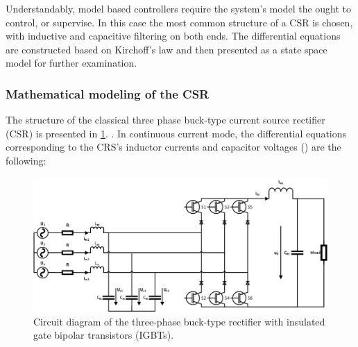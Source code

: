 Understandably, model based controllers require the system's model the ought to control, or supervise. In this case the most common structure of a CSR is chosen, with inductive and capacitive filtering on both ends. The differential equations are constructed based on Kirchoff's law and then presented as a state space model for further examination.

\subsubsection{Mathematical modeling of the CSR}\label{EMPC:sec:ModelofCSR}

    The structure of the classical three phase buck-type current source rectifier (CSR) is presented in \ref{EMPC:fig:network}.  .  In continuous current mode, the differential equations corresponding to the CRS’s inductor currents and capacitor voltages () are the following:

    \begin{figure}[!ht]
        \centering
        \includegraphics[width=\textwidth]{EMPC_PNG_Pics/circuit.png}
        \caption{Circuit diagram of the three-phase buck-type rectifier with insulated gate bipolar transistors (IGBTs).}
        \label{EMPC:fig:network}
    \end{figure}
		
